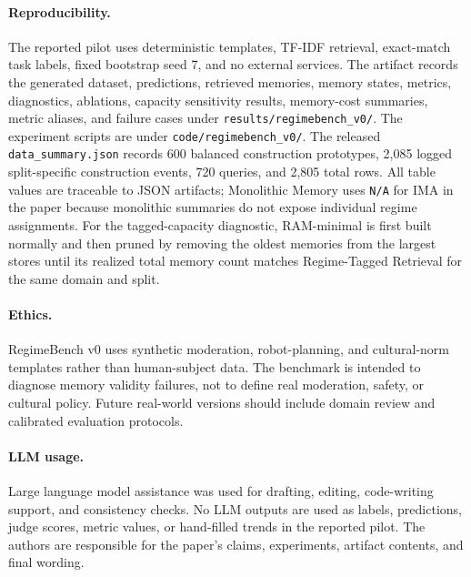 \documentclass{article} %
\begin{document}
\paragraph{Reproducibility.}
The reported pilot uses deterministic templates, TF-IDF retrieval, exact-match task labels, fixed bootstrap seed 7, and no external services.
The artifact records the generated dataset, predictions, retrieved memories, memory states, metrics, diagnostics, ablations, capacity sensitivity results, memory-cost summaries, metric aliases, and failure cases under \texttt{results/regimebench\_v0/}.
The experiment scripts are under \texttt{code/regimebench\_v0/}.
The released \texttt{data\_summary.json} records 600 balanced construction prototypes, 2,085 logged split-specific construction events, 720 queries, and 2,805 total rows.
All table values are traceable to JSON artifacts; Monolithic Memory uses \texttt{N/A} for IMA in the paper because monolithic summaries do not expose individual regime assignments.
For the tagged-capacity diagnostic, RAM-minimal is first built normally and then pruned by removing the oldest memories from the largest stores until its realized total memory count matches Regime-Tagged Retrieval for the same domain and split.

\paragraph{Ethics.}
RegimeBench v0 uses synthetic moderation, robot-planning, and cultural-norm templates rather than human-subject data.
The benchmark is intended to diagnose memory validity failures, not to define real moderation, safety, or cultural policy.
Future real-world versions should include domain review and calibrated evaluation protocols.

\paragraph{LLM usage.}
Large language model assistance was used for drafting, editing, code-writing support, and consistency checks.
No LLM outputs are used as labels, predictions, judge scores, metric values, or hand-filled trends in the reported pilot.
The authors are responsible for the paper's claims, experiments, artifact contents, and final wording.
\end{document}
